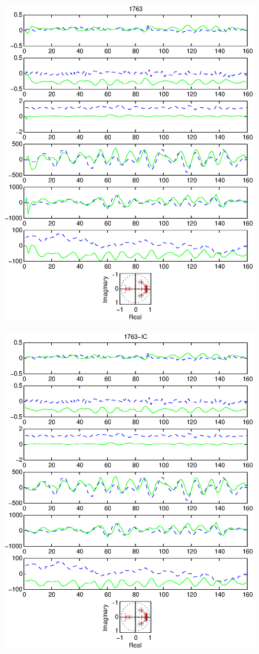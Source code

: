 \documentclass{article}
\begin{document}
\begin{figure}[htb!]
\centering
\includegraphics{1763.eps}
\end{figure}\clearpage
\begin{figure}[htb!]
\centering
\includegraphics{1763_ic.eps}
\end{figure}\clearpage
\end{document}
